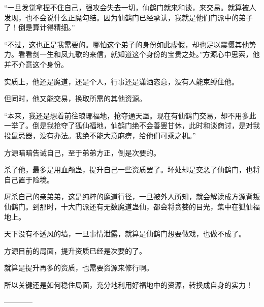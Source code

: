 \begin{this_body}
“一旦发觉拿捏不住自己，强攻会失去一切，仙鹤门就来和谈，来交易。就算被人发现，也不会说什么正魔勾结。因为仙鹤门已经承认，我就是他们门派中的弟子了！倒是算计得精细。”

“不过，这也正是我需要的。哪怕这个弟子的身份如此虚假，却也足以震慑其他势力。看看剑一生和凤九歌的来信，就知道这个身份的宝贵之处。”方源心中思索，他并不介意这个身份。

实质上，他还是魔道，还是个人，行事还是潇洒恣意，没有人能束缚住他。

但同时，他又能交易，换取所需的其他资源。

“本来，我还是想着前往琅琊福地，抢夺通天蛊。现在有仙鹤门交易，却不用多此一举了。倒是我抢夺了狐仙福地，仙鹤门绝不会善罢甘休，此时和谈商讨，是对我投鼠忌器，没有办法。我绝不能大意麻痹，给他们可乘之机。”

方源暗暗告诫自己，至于弟弟方正，倒是次要的。

杀了他，最多是用血颅蛊，提升自己一些资质罢了。坏处却是交恶了仙鹤门，也将自己置于险境。

屠杀自己的亲弟弟，这是纯粹的魔道行径，一旦被外人所知，就会解读成方源背叛仙鹤门。到那时，十大门派还有无数魔道蛊仙，都会将贪婪的目光，集中在狐仙福地上。

天下没有不透风的墙，一旦事情泄露，就算是仙鹤门想要做戏，也做不成了。

方源目前的局面，提升资质已经是次要的了。

就算是提升再多的资质，也需要资源来修行啊。

所以关键还是如何稳住局面，充分地利用好福地中的资源，转换成自身的实力！

------------

\end{this_body}

